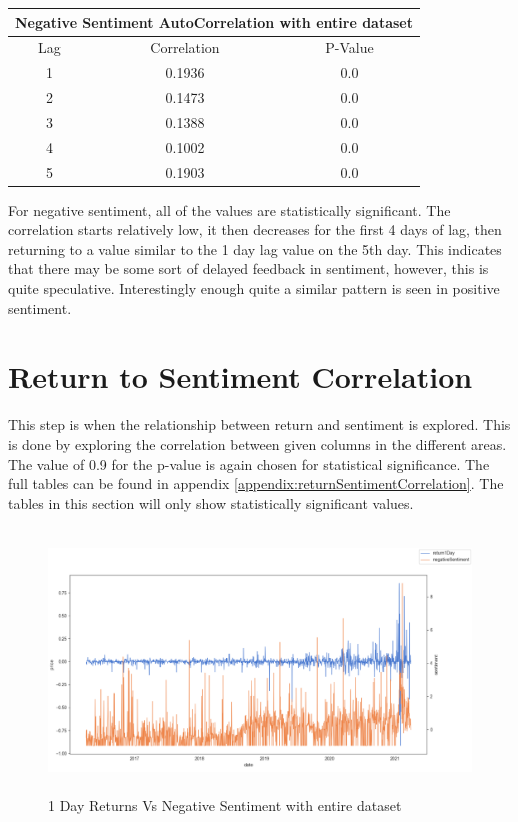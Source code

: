 \begin{center}
\begin{tabular}{ c c c }
\hline
\multicolumn{3}{|c|}{Negative Sentiment AutoCorrelation with entire dataset} \\
\hline
Lag & Correlation & P-Value \\
\hline
1 & 0.1936 & 0.0 \\
2 & 0.1473 & 0.0 \\
3 & 0.1388 & 0.0 \\
4 & 0.1002 & 0.0 \\
5 & 0.1903 & 0.0 \\
\end{tabular}
\end{center}
For negative sentiment, all of the values are statistically significant. The correlation starts relatively low, it then decreases for the first 4 days of lag, then returning to a value similar to the 1 day lag value on the 5th day. This indicates that there may be some sort of delayed feedback in sentiment, however, this is quite speculative. Interestingly enough quite a similar pattern is seen in positive sentiment.

\section{Return to Sentiment Correlation}

This step is when the relationship between return and sentiment is explored. This is done by exploring the correlation between given columns in the different areas. The value of 0.9 for the p-value is again chosen for statistical significance. The full tables can be found in appendix \ref{appendix:returnSentimentCorrelation}. The tables in this section will only show statistically significant values.

\begin{figure}[h!]
    \centering
    \includegraphics[width=15cm,height=7cm,keepaspectratio]{resultsEvaluation/1returnVsNeg.png}
    \caption{1 Day Returns Vs Negative Sentiment with entire dataset}
    \label{fig:1returnVsNeg}
\end{figure}

